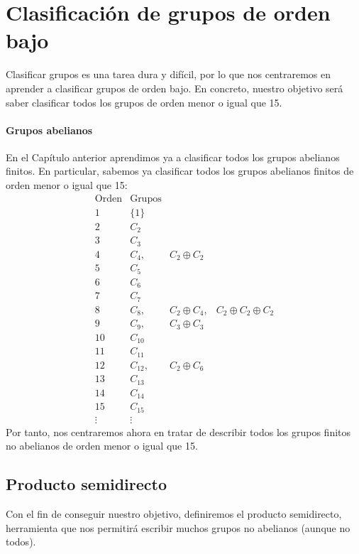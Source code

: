 \chapter{Clasificación de grupos de orden bajo}
\noindent
Clasificar grupos es una tarea dura y difícil, por lo que nos centraremos en aprender a clasificar grupos de orden bajo. En concreto, nuestro objetivo será saber clasificar todos los grupos de orden menor o igual que 15.

\subsubsection{Grupos abelianos}
\noindent
En el Capítulo anterior aprendimos ya a clasificar todos los grupos abelianos finitos. En particular, sabemos ya clasificar todos los grupos abelianos finitos de orden menor o igual que 15:
\begin{equation*}
    \begin{array}{c|ccc}
        \text{Orden}  & \text{Grupos} & &  \\
        \hline
        1 & \{1\} &  &\\
        2 & C_2 & & \\
        3 & C_3 & & \\
        4 & C_4, &  C_2\oplus C_2& \\
        5 & C_5 & & \\
        6 & C_6 & & \\
        7 & C_7 & & \\
        8 & C_8, &  C_2\oplus C_4,  & C_2\oplus C_2 \oplus C_2\\
        9 & C_9, &  C_3\oplus C_3 & \\
        10 & C_{10} & & \\
        11 & C_{11} & & \\
        12 & C_{12}, &  C_2\oplus C_6 & \\
        13 & C_{13} & & \\
        14 & C_{14} & & \\
        15 & C_{15} & & \\
        \vdots & \vdots 
    \end{array}
\end{equation*}
\noindent
Por tanto, nos centraremos ahora en tratar de describir todos los grupos finitos no abelianos de orden menor o igual que 15.

\section{Producto semidirecto}
\noindent
Con el fin de conseguir nuestro objetivo, definiremos el producto semidirecto, herramienta que nos permitirá escribir muchos grupos no abelianos (aunque no todos).

